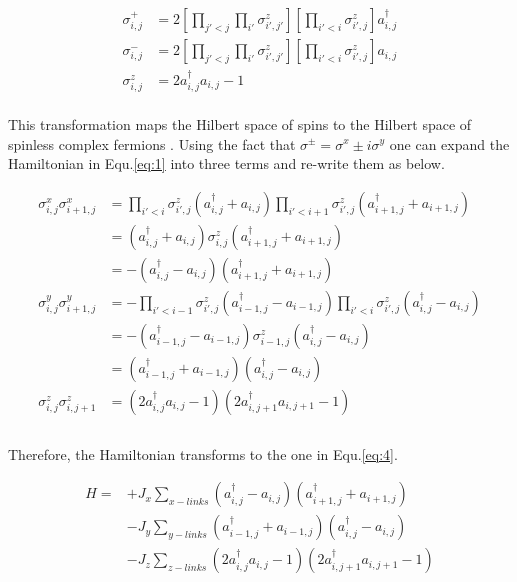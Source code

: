 \documentclass{article}
\begin{document}
\begin{equation}\label{eq:2}
	\begin{aligned}
		\sigma^{+}_{i,j} &= 2[\prod_{j'<j}\prod_{i'}\sigma^{z}_{i',j'}][\prod_{i'<i}\sigma^z_{i',j}] a^{\dagger}_{i,j}\\
		\sigma^{-}_{i,j} &= 2[\prod_{j'<j}\prod_{i'}\sigma^{z}_{i',j'}][\prod_{i'<i}\sigma^z_{i',j}] a_{i,j}\\
		\sigma^{z}_{i,j} &= 2a^{\dagger}_{i,j}a_{i,j} - 1
	\end{aligned}
\end{equation}\\

\noindent This transformation maps the Hilbert space of spins to the Hilbert space of spinless complex fermions \cite{schmull}. Using the fact that $ \sigma^{\pm} = \sigma^{x}\pm i\sigma^{y} $ one can expand the Hamiltonian in Equ.\hspace{0.2mm}\ref{eq:1} into three terms and re-write them as below.


\begin{equation}\label{eq:3}
	\begin{aligned}
		\sigma^{x}_{i,j}\sigma^{x}_{i+1,j} &= \prod_{i'<i}\sigma^z_{i',j} (a^{\dagger}_{i,j} + a_{i,j}) \prod_{i'<i+1}\sigma^z_{i',j} (a^{\dagger}_{i+1,j} + a_{i+1,j})\\
		&= (a^{\dagger}_{i,j} + a_{i,j}) \sigma^z_{i,j} (a^{\dagger}_{i+1,j} + a_{i+1,j})\\
		&= -(a^{\dagger}_{i,j} - a_{i,j}) (a^{\dagger}_{i+1,j} + a_{i+1,j})\\
		\sigma^{y}_{i,j}\sigma^{y}_{i+1,j} &= -\prod_{i'<i-1}\sigma^z_{i',j} (a^{\dagger}_{i-1,j} - a_{i-1,j}) \prod_{i'<i}\sigma^z_{i',j} (a^{\dagger}_{i,j} - a_{i,j})\\
		&= -(a^{\dagger}_{i-1,j} - a_{i-1,j}) \sigma^z_{i-1,j} (a^{\dagger}_{i,j} - a_{i,j})\\
		&= (a^{\dagger}_{i-1,j} + a_{i-1,j}) (a^{\dagger}_{i,j} - a_{i,j})\\
		\sigma^{z}_{i,j}\sigma^{z}_{i,j+1} &=  (2a^{\dagger}_{i,j}a_{i,j} - 1) (2a^{\dagger}_{i,j+1}a_{i,j+1} - 1)\\
	\end{aligned}
\end{equation}\\

\noindent Therefore, the Hamiltonian transforms to the one in Equ.\hspace{0.2mm}\ref{eq:4}. 

\begin{equation}\label{eq:4}
	\begin{aligned}
		H= &+J_x \sum_{x-links} (a^{\dagger}_{i,j} - a_{i,j}) (a^{\dagger}_{i+1,j} + a_{i+1,j})\\
		&-J_y \sum_{y-links} (a^{\dagger}_{i-1,j} + a_{i-1,j}) (a^{\dagger}_{i,j} - a_{i,j})\\
		&-J_z \sum_{z-links} (2a^{\dagger}_{i,j}a_{i,j} - 1) (2a^{\dagger}_{i,j+1}a_{i,j+1} - 1)\\
	\end{aligned}
\end{equation}\\
\end{document}
